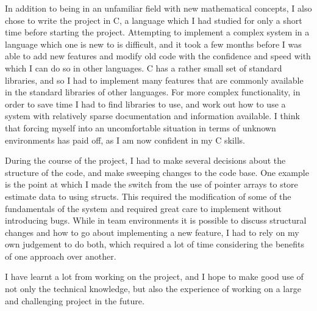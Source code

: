 \documentclass[a4paper,11pt]{article}
\begin{document}
   In addition to being in an unfamiliar field with new mathematical concepts, I
   also chose to write the project in C, a language which I had studied for only
   a short time before starting the project. Attempting to implement a complex
   system in a language which one is new to is difficult, and it took a few
   months before I was able to add new features and modify old code with the
   confidence and speed with which I can do so in other languages. C has a
   rather small set of standard libraries, and so I had to implement many
   features that are commonly available in the standard libraries of other
   languages. For more complex functionality, in order to save time I had to
   find libraries to use, and work out how to use a system with relatively
   sparse documentation and information available. I think that forcing myself
   into an uncomfortable situation in terms of unknown environments has paid
   off, as I am now confident in my C skills.

   During the course of the project, I had to make several decisions about the
   structure of the code, and make sweeping changes to the code base. One
   example is the point at which I made the switch from the use of pointer
   arrays to store estimate data to using structs. This required the
   modification of some of the fundamentals of the system and required great
   care to implement without introducing bugs. While in team environments it is
   possible to discuss structural changes and how to go about implementing a new
   feature, I had to rely on my own judgement to do both, which required a lot
   of time considering the benefits of one approach over another.

   I have learnt a lot from working on the project, and I hope to make good use
   of not only the technical knowledge, but also the experience of working on a
   large and challenging project in the future.

   \newpage
   \printbibliography
   \newpage
\end{document}
